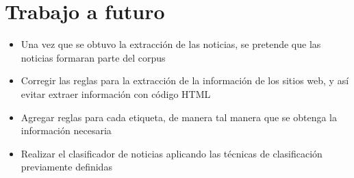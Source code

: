 \section{Trabajo a futuro}
\begin{itemize}
  \item Una vez que se obtuvo la extracción de las noticias, se pretende que las noticias formaran parte del corpus
  \item Corregir las reglas para la extracción de la información de los sitios web, y así evitar extraer información con código HTML
  \item Agregar reglas para cada etiqueta, de manera tal manera que se obtenga la información necesaria
  \item Realizar el clasificador de noticias aplicando las técnicas de clasificación previamente definidas
\end{itemize}



